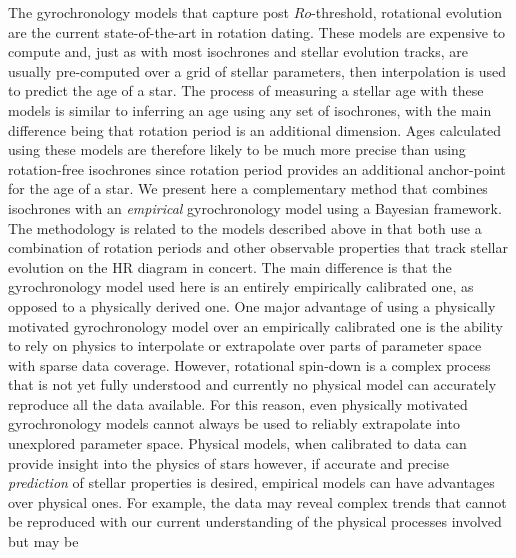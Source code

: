 The gyrochronology models that capture post $Ro$-threshold, rotational
evolution \citep{vansaders2016} are the current state-of-the-art in rotation
dating.
These models are expensive to compute and, just as with most isochrones and
stellar evolution tracks, are usually pre-computed over a grid of stellar
parameters, then interpolation is used to predict the age of a star.
The process of measuring a stellar age with these models is similar to
inferring an age using any set of isochrones, with the main difference being
that rotation period is an additional dimension.
Ages calculated using these models are therefore likely to be much more
precise than using rotation-free isochrones since rotation period provides an
additional anchor-point for the age of a star.
We present here a complementary method that combines isochrones with an {\it
empirical} gyrochronology model using a Bayesian framework.
The methodology is related to the models described above \citep{vansaders2016}
in that both use a combination of rotation periods and other observable
properties that track stellar evolution on the HR diagram in concert.
The main difference is that the gyrochronology model used here is an entirely
empirically calibrated one, as opposed to a physically derived one.
One major advantage of using a physically motivated gyrochronology model over
an empirically calibrated one is the ability to rely on physics to interpolate
or extrapolate over parts of parameter space with sparse data coverage.
However, rotational spin-down is a complex process that is not yet fully
understood and currently no physical model can accurately reproduce all the
data available.
For this reason, even physically motivated gyrochronology models cannot always
be used to reliably extrapolate into unexplored parameter space.
Physical models, when calibrated to data can provide insight into the physics
of stars however, if accurate and precise {\it prediction} of stellar
properties is desired, empirical models can have advantages over physical
ones.
For example, the data may reveal complex trends that cannot be reproduced with
our current understanding of the physical processes involved but may be
